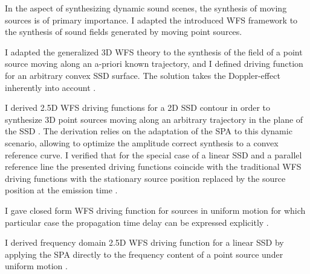 \begin{thesisgroup}
In the aspect of synthesizing dynamic sound scenes, the synthesis of moving sources is of primary importance.
I adapted the introduced WFS framework to the synthesis of sound fields generated by moving point sources.
\begin{thesis}
I adapted the generalized 3D WFS theory to the synthesis of the field of a point source moving along an a-priori known trajectory, and I defined driving function for an arbitrary convex SSD surface.
The solution takes the Doppler-effect inherently into account \cite{Firtha2015:daga, firtha2016wave, doi:10.1121/1.4996126}.\end{thesis}
\begin{thesis}
I derived 2.5D WFS driving functions for a 2D SSD contour in order to synthesize 3D point sources moving along an arbitrary trajectory in the plane of the SSD \cite{doi:10.1121/1.4996126}.
The derivation relies on the adaptation of the SPA to this dynamic scenario, allowing to optimize the amplitude correct synthesis to a convex reference curve. 
I verified that for the special case of a linear SSD and a parallel reference line the presented driving functions coincide with the traditional WFS driving functions with the stationary source position replaced by the source position at the emission time \cite{doi:10.1121/1.4996126}.
\end{thesis}
\begin{thesis}
I gave closed form WFS driving function for sources in uniform motion for which particular case the propagation time delay can be expressed explicitly \cite{firtha2016wave}.
\end{thesis}
\begin{thesis}
I derived frequency domain 2.5D WFS driving function for a linear SSD by applying the SPA directly to the frequency content of a point source under uniform motion \cite{firtha2015sound}.
\end{thesis}
\end{thesisgroup}

